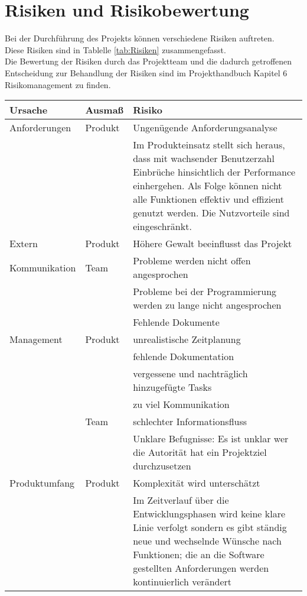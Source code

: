 \chapter{Risiken und Risikobewertung}
Bei der Durchführung des Projekts können verschiedene Risiken auftreten. \\
Diese Risiken sind in Tablelle \ref{tab:Risiken} zusammengefasst. \\
Die Bewertung der Risiken durch das Projektteam und die dadurch getroffenen Entscheidung zur Behandlung der Risiken sind im Projekthandbuch Kapitel 6 Risikomanagement zu finden.
\begin{table}
\centering
\scriptsize
\begin{tabularx}{\textwidth}{|l|l|X|} 
\hline
\textbf{Ursache} & \textbf{Ausmaß} & \textbf{Risiko} \\
\hline
Anforderungen & Produkt & Ungenügende Anforderungsanalyse  \\ 
\hline
 &  & Im Produkteinsatz stellt sich heraus, dass mit wachsender Benutzerzahl Einbrüche hinsichtlich der Performance einhergehen. Als Folge können nicht alle Funktionen effektiv und effizient genutzt werden. Die Nutzvorteile sind eingeschränkt.  \\ 
\hline
Extern & Produkt & Höhere Gewalt beeinflusst das Projekt  \\ 
\hline
Kommunikation & Team & Probleme werden nicht offen angesprochen \\ 
\hline
 &  & Probleme bei der Programmierung werden zu lange nicht angesprochen \\ 
\hline
 &  & Fehlende Dokumente\\ 
\hline
Management & Produkt & unrealistische Zeitplanung \\ 
\hline
 &  & fehlende Dokumentation \\ 
\hline
 &  & vergessene und nachträglich hinzugefügte Tasks \\ 
\hline
 &  & zu viel Kommunikation\\ 
\hline
 & Team & schlechter Informationsfluss \\ 
\hline
 &  & Unklare Befugnisse: Es ist unklar wer die Autorität hat ein Projektziel durchzusetzen  \\ 
\hline
Produktumfang & Produkt & Komplexität wird unterschätzt \\ 
\hline
 &  & Im Zeitverlauf über die Entwicklungsphasen wird keine klare Linie verfolgt sondern es gibt ständig neue und wechselnde Wünsche nach Funktionen; die an die Software gestellten Anforderungen werden kontinuierlich verändert\\ 

\end{tabularx}
\end{table}
